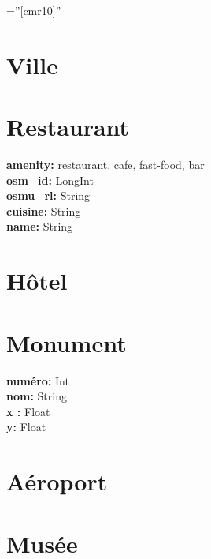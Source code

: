 \documentclass[a4paper,10pt]{article} %
\begin{document}
\font\fb=''[cmr10]'' %

\par{\bigskip \bigskip \par}

\section{ Ville} 

\bigskip
\section{ Restaurant}
\textbf{ amenity:} restaurant, cafe, fast-food, bar\\
\textbf{osm\_id:} LongInt \\
\textbf{osmu\_rl:} String \\
\textbf{cuisine:} String \\
\textbf{name:} String

\bigskip
\section{ Hôtel}

\bigskip
\section{ Monument}
\textbf{ numéro:} Int\\
\textbf{nom:} String \\
\textbf{x :} Float \\
\textbf{y:} Float

\bigskip
\section{ Aéroport}

\bigskip
\section{ Musée}

\bigskip

\end{document}
